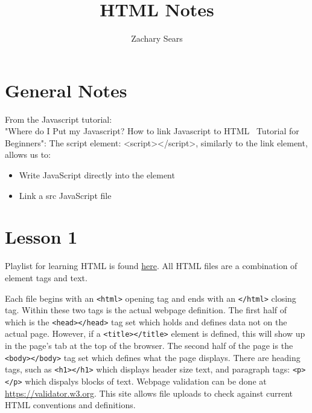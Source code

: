 \documentclass{article}
\title{HTML Notes}
\author{Zachary Sears}
\begin{document}
\maketitle
\section{General Notes} \label{sec:General}
From the Javascript tutorial:\\
"Where do I Put my Javascript? How to link Javascript
to HTML \textbar\ Tutorial for Beginners":
The script element: <script></script>, similarly to the link element, allows us to:
\begin{itemize}
    \item Write JavaScript directly into the element
    \item Link a src JavaScript file
\end{itemize}

\section{Lesson 1} \label{sec:L1}
Playlist for learning HTML is found \href{https://www.youtube.com/playlist?list=PL0Zuz27SZ-6OlAwitnFUubtE93DO-l0vu}{here}.
All HTML files are a combination of element tags and text.

Each file begins with an \verb|<html>| opening tag and ends with an \verb|</html>| closing tag.
Within these two tags is the actual webpage definition. The first half of which is the \verb|<head></head>| tag set which holds
and defines data not on the actual page. However, if a \verb|<title></title>| element is defined, this will show up in the page's
tab at the top of the browser. The second half of the page is the \verb|<body></body>| tag set which defines what the page displays.
There are heading tags, such as \verb|<h1></h1>| which displays header size text, and paragraph tags: \verb|<p></p>| which dispalys
blocks of text.
Webpage validation can be done at \url{https://validator.w3.org}. This site allows file uploads to check against current HTML conventions
and definitions.
\end{document}

